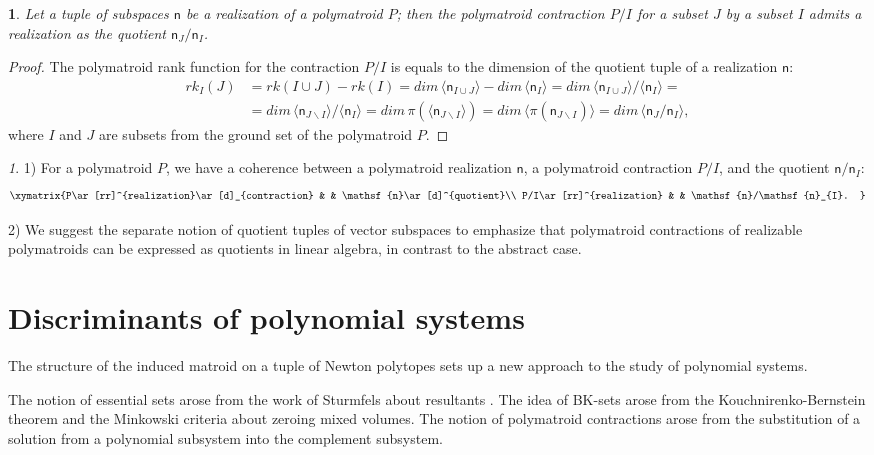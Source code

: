 \documentclass[11pt]{article}
\theoremstyle{plain}
\theoremstyle{definition}
\theoremstyle{remark}
\newtheorem{rem}[thm]{\protect\remarkname}
\theoremstyle{plain}
\theoremstyle{plain}
\newtheorem{prop}[thm]{\protect\propositionname}
\theoremstyle{plain}
\theoremstyle{definition}
\providecommand{\propositionname}{Proposition}
\providecommand{\remarkname}{Remark}
\begin{document}
\begin{prop}
\label{Proposition. Polymatroid contraction and quotient}Let a tuple
of subspaces $\mathsf{n}$ be a realization of a polymatroid $P$;
then the polymatroid contraction $P/I$ for a subset $J$ by a subset
$I$ admits a realization as the quotient $\mathsf{n}_{J}/\mathsf{n}_{I}$.
\end{prop}

\begin{proof}
The polymatroid rank function for the contraction $P/I$ is equals
to the dimension of the quotient tuple of a realization $\mathsf{n}$:
\begin{align*}
rk_{I}(J) & =rk(I\cup J)-rk(I)=dim\,\langle\mathsf{n}_{I\cup J}\rangle-dim\,\langle\mathsf{n}_{I}\rangle=dim\,\langle\mathsf{n}_{I\cup J}\rangle/\langle\mathsf{n}_{I}\rangle=\\
 & =dim\,\langle\mathsf{n}_{J\backslash I}\rangle/\langle\mathsf{n}_{I}\rangle=dim\,\pi(\langle\mathsf{n}_{J\backslash I}\rangle)=dim\,\langle\pi(\mathsf{n}_{J\backslash I})\rangle=dim\,\langle\mathsf{n}_{J}/\mathsf{n}_{I}\rangle,
\end{align*}
where $I$ and $J$ are subsets from the ground set of the polymatroid
$P$.
\end{proof}
\begin{rem}
1) For a polymatroid $P$, we have a coherence between a polymatroid
realization $\mathsf{n}$, a polymatroid contraction $P/I$, and the
quotient $\mathsf{n}/\mathsf{n}_{I}$:
\[
\xymatrix{P\ar[rr]^{realization}\ar[d]_{contraction} &  & \mathsf{n}\ar[d]^{quotient}\\
P/I\ar[rr]^{realization} &  & \mathsf{n}/\mathsf{n}_{I}.
}
\]

2) We suggest the separate notion of quotient tuples of vector subspaces
to emphasize that polymatroid contractions of realizable polymatroids
can be expressed as quotients in linear algebra, in contrast to the
abstract case.
\end{rem}


\section{\label{Section. Disctriminants}Discriminants of polynomial systems}

The structure of the induced matroid on a tuple of Newton polytopes
sets up a new approach to the study of polynomial systems.

The notion of essential sets arose from the work of Sturmfels about
resultants \cite{sturmfels_newton_1994}. The idea of BK-sets arose
from the Kouchnirenko-Bernstein theorem \cite{bernshtein_number_1975}
and the Minkowski criteria about zeroing mixed volumes. The notion
of polymatroid contractions arose from the substitution of a solution
from a polynomial subsystem into the complement subsystem.
\end{document}
